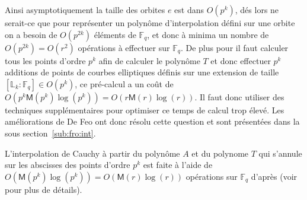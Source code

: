 \documentclass[10pt,a4paper]{book}
\theoremstyle{plain}
\theoremstyle{definition}
\newtheorem{lem}[thm]{Lemme}
\theoremstyle{definition}
\theoremstyle{definition}
\theoremstyle{definition}
\theoremstyle{remark}
\theoremstyle{remark}
\theoremstyle{definition}
\begin{document}
Ainsi asymptotiquement la taille des orbites $e$ est dans $O(p^k)$, dés lors ne
serait-ce que pour représenter un polynôme d'interpolation défini sur une 
orbite on a besoin de $O(p^{2k})$ éléments de $\mathbb{F}_q$, et donc à minima 
un nombre de $O(p^{2k})=O(r^2)$ opérations à effectuer sur $\mathbb{F}_q$. De 
plus pour il faut calculer tous les points d'ordre $p^k$ afin de calculer le
polynôme $T$ et donc 
effectuer $p^k$ additions de points de courbes elliptiques définis sur une 
extension de taille $[\mathbb{L}_k:\mathbb{F}_q] \in O(p^k) $, ce pré-calcul a 
un coût de $O(p^k\mathsf{M}(p^k)\log(p^k))=O(r\mathsf{M}(r)\log(r))$. Il faut 
donc utiliser des techniques supplémentaires pour optimiser ce temps de calcul 
trop élevé. Les améliorations de De Feo \cite{DeFeo11} ont donc résolu cette 
question et sont présentées dans la sous section~\ref{sub:fro:int}.

L'interpolation de Cauchy à partir du polynôme $A$ et du polynome $T$ qui s'annule sur les abscisses des points d'ordre $p^k$ est faite à l'aide de $O(\mathsf{M}(p^{k})\log(p^k))=O(\mathsf{M}(r)\log(r))$ opérations sur $\mathbb{F}_q$ d'après \cite[§ 11.1]{vzGJG03} (voir \cite[Théorème 7.5]{algeff17} pour plus de détails).

%
\end{document}
